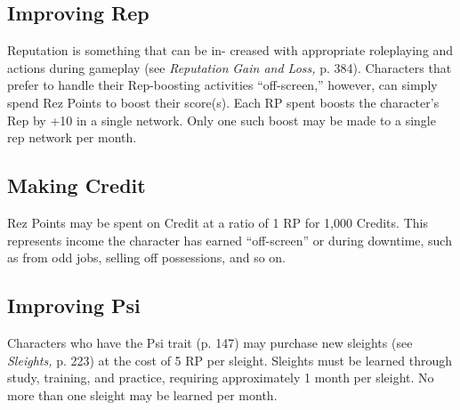 \subsection{Improving Rep}

Reputation is something that can be in-
creased with appropriate roleplaying and 
actions during gameplay (see \textit{Reputation }
\textit{Gain and Loss,} p. 384). Characters that 
prefer to handle their Rep-boosting activities 
``off-screen,'' however, can simply spend Rez 
Points to boost their score(s). Each RP spent 
boosts the character's Rep by +10 in a single 
network. Only one such boost may be made 
to a single rep network per month.

\subsection{Making Credit}

Rez Points may be spent on Credit at a ratio 
of 1 RP for 1,000 Credits. This represents 
income the character has earned ``off-screen'' 
or during downtime, such as from odd jobs, 
selling off possessions, and so on.

\subsection{Improving Psi}

Characters who have the Psi trait (p. 147) 
may purchase new sleights (see \textit{Sleights,} p. 
223) at the cost of 5 RP per sleight. Sleights 
must be learned through study, training, and 
practice, requiring approximately 1 month 
per sleight. No more than one sleight may be 
learned per month.
